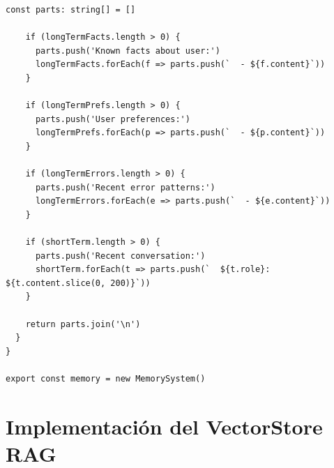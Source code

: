 \begin{lstlisting}[style=ts,caption={Sistema de memoria dual (corto y largo plazo)}]
    const parts: string[] = []

    if (longTermFacts.length > 0) {
      parts.push('Known facts about user:')
      longTermFacts.forEach(f => parts.push(`  - ${f.content}`))
    }

    if (longTermPrefs.length > 0) {
      parts.push('User preferences:')
      longTermPrefs.forEach(p => parts.push(`  - ${p.content}`))
    }

    if (longTermErrors.length > 0) {
      parts.push('Recent error patterns:')
      longTermErrors.forEach(e => parts.push(`  - ${e.content}`))
    }

    if (shortTerm.length > 0) {
      parts.push('Recent conversation:')
      shortTerm.forEach(t => parts.push(`  ${t.role}: ${t.content.slice(0, 200)}`))
    }

    return parts.join('\n')
  }
}

export const memory = new MemorySystem()
\end{lstlisting}

\chapter{Implementación del VectorStore RAG}
\label{app:vectorstore-code}

